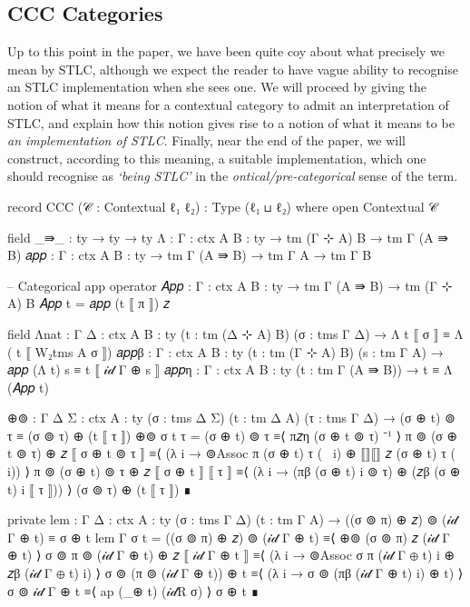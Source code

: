 \subsection{CCC Categories}

Up to this point in the paper, we have been quite coy about what precisely we
mean by STLC, although we expect the reader to have vague ability to recognise
an STLC implementation when she sees one. We will proceed by giving the notion
of what it means for a contextual category to admit an interpretation of STLC,
and explain how this notion gives rise to a notion of what it means to be
\emph{an implementation of STLC}. Finally, near the end of the paper, we will
construct, according to this meaning, a suitable implementation, which one
should recognise as \emph{`being STLC'} in the \emph{ontical/pre-categorical}
sense of the term.

\begin{code}
record CCC (𝒞 : Contextual ℓ₁ ℓ₂) : Type (ℓ₁ ⊔ ℓ₂) where
  open Contextual 𝒞

  field
    _⇛_ : ty → ty → ty
    Λ : {Γ : ctx} {A B : ty} → tm (Γ ⊹ A) B → tm Γ (A ⇛ B)
    𝑎𝑝𝑝 : {Γ : ctx} {A B : ty} → tm Γ (A ⇛ B) → tm Γ A → tm Γ B

  -- Categorical app operator
  𝐴𝑝𝑝 : {Γ : ctx} {A B : ty} → tm Γ (A ⇛ B) → tm (Γ ⊹ A) B
  𝐴𝑝𝑝 t = 𝑎𝑝𝑝 (t ⟦ π ⟧) 𝑧

  field
    Λnat : {Γ Δ : ctx} {A B : ty} (t : tm (Δ ⊹ A) B) (σ : tms Γ Δ) →
      Λ t ⟦ σ ⟧ ≡  Λ ( t ⟦ W₂tms A σ ⟧)
    𝑎𝑝𝑝β : {Γ : ctx} {A B : ty} (t : tm (Γ ⊹ A) B) (s : tm Γ A) →
      𝑎𝑝𝑝 (Λ t) s ≡ t ⟦ 𝒾𝒹 Γ ⊕ s ⟧
    𝑎𝑝𝑝η : {Γ : ctx} {A B : ty} (t : tm Γ (A ⇛ B)) →
      t ≡ Λ (𝐴𝑝𝑝 t)
\end{code}

\begin{code}[hide]
  ⊕⊚ : {Γ Δ Σ : ctx} {A : ty} (σ : tms Δ Σ) (t : tm Δ A) (τ : tms Γ Δ) →
    (σ ⊕ t) ⊚ τ ≡ (σ ⊚ τ) ⊕ (t ⟦ τ ⟧)
  ⊕⊚ σ t τ =
    (σ ⊕ t) ⊚ τ
      ≡⟨ π𝑧η (σ ⊕ t ⊚ τ) ⁻¹ ⟩
    π ⊚ (σ ⊕ t ⊚ τ) ⊕ 𝑧 ⟦ σ ⊕ t ⊚ τ ⟧
      ≡⟨ (λ i → ⊚Assoc π (σ ⊕ t) τ (~ i) ⊕ ⟦⟧⟦⟧ 𝑧 (σ ⊕ t) τ (~ i)) ⟩
    π ⊚ (σ ⊕ t) ⊚ τ ⊕ 𝑧 ⟦ σ ⊕ t ⟧ ⟦ τ ⟧
      ≡⟨ (λ i → (πβ (σ ⊕ t) i ⊚ τ) ⊕ (𝑧β (σ ⊕ t) i ⟦ τ ⟧)) ⟩
    (σ ⊚ τ) ⊕ (t ⟦ τ ⟧)
      ∎

  private
    lem : {Γ Δ : ctx} {A : ty} (σ : tms Γ Δ) (t : tm Γ A) →
      ((σ ⊚ π) ⊕ 𝑧) ⊚ (𝒾𝒹 Γ ⊕ t) ≡ σ ⊕ t
    lem {Γ} σ t =
      ((σ ⊚ π) ⊕ 𝑧) ⊚ (𝒾𝒹 Γ ⊕ t)
        ≡⟨ ⊕⊚ (σ ⊚ π) 𝑧 (𝒾𝒹 Γ ⊕ t) ⟩
      σ ⊚ π ⊚ (𝒾𝒹 Γ ⊕ t) ⊕ 𝑧 ⟦ 𝒾𝒹 Γ ⊕ t ⟧
        ≡⟨ (λ i → ⊚Assoc σ π (𝒾𝒹 Γ ⊕ t) i ⊕ 𝑧β (𝒾𝒹 Γ ⊕ t) i) ⟩
      σ ⊚ (π ⊚ (𝒾𝒹 Γ ⊕ t)) ⊕ t
        ≡⟨ (λ i → σ ⊚ (πβ (𝒾𝒹 Γ ⊕ t) i) ⊕ t) ⟩
      σ ⊚ 𝒾𝒹 Γ ⊕ t
        ≡⟨ ap (_⊕ t) (𝒾𝒹R σ) ⟩
      σ ⊕ t
        ∎
\end{code}

